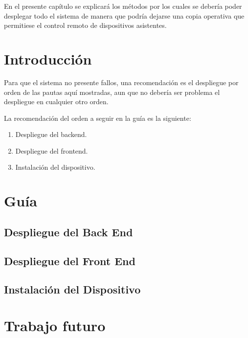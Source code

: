 
En el presente capítulo se explicará los métodos por los cuales se debería poder desplegar todo el sistema de manera que podría dejarse una copia operativa que permitiese el control remoto de dispositivos asistentes.

\section{Introducción}

    Para que el sistema no presente fallos, una recomendación es el despliegue por orden de las pautas aquí mostradas, aun que no debería ser problema el despliegue en cualquier otro orden.

    La recomendación del orden a seguir en la guía es la siguiente:
    
    \begin{enumerate}
    
        \item Despliegue del backend.
        
        \item Despliegue del frontend.
        
        \item Instalación del dispositivo.
        
    \end{enumerate}
\newpage
\section{Guía}
\subsection{ Despliegue del Back End}
    
    
\subsection{ Despliegue del Front End}
    
    
\subsection{ Instalación del Dispositivo}
    


\newpage
\section{Trabajo futuro}

 
